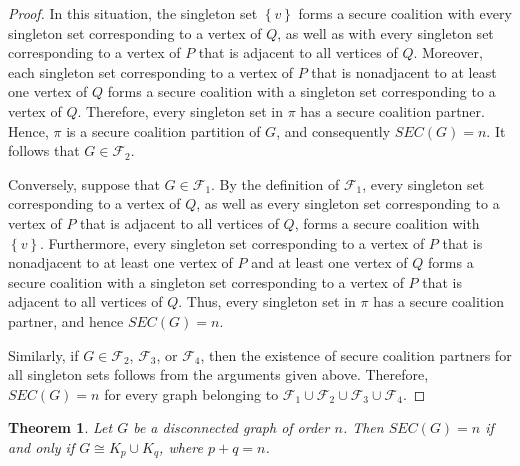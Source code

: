 \documentclass[12pt]{article}
\newtheorem{theorem}{Theorem}[section]
\begin{document}
\begin{proof}
In this situation, the singleton set $\left\{v\right\}$ forms a secure coalition with every singleton set corresponding to a vertex of $Q$, as well as with every singleton set corresponding to a vertex of $P$ that is adjacent to all vertices of $Q$. Moreover, each singleton set corresponding to a vertex of $P$ that is nonadjacent to at least one vertex of $Q$ forms a secure coalition with a singleton set corresponding to a vertex of $Q$. Therefore, every singleton set in $\pi$ has a secure coalition partner. Hence, $\pi$ is a secure coalition partition of $G$, and consequently $SEC(G)=n$. It follows that $G\in\mathcal{F}_2$.

\medskip

Conversely, suppose that $G\in\mathcal{F}_1$. By the definition of $\mathcal{F}_1$, every singleton set corresponding to a vertex of $Q$, as well as every singleton set corresponding to a vertex of $P$ that is adjacent to all vertices of $Q$, forms a secure coalition with $\left\{v\right\}$. Furthermore, every singleton set corresponding to a vertex of $P$ that is nonadjacent to at least one vertex of $P$ and at least one vertex of $Q$ forms a secure coalition with a singleton set corresponding to a vertex of $P$ that is adjacent to all vertices of $Q$. Thus, every singleton set in $\pi$ has a secure coalition partner, and hence
$SEC(G)=n$.

Similarly, if $G\in\mathcal{F}_2$, $\mathcal{F}_3$, or $\mathcal{F}_4$, then the existence of secure coalition partners for all singleton sets follows from the arguments given above. Therefore, $SEC(G)=n$ for every graph belonging to $\mathcal{F}_1\cup\mathcal{F}_2\cup\mathcal{F}_3\cup\mathcal{F}_4$.
\end{proof}
\begin{theorem}
Let $G$ be a disconnected graph of order $n$. Then $SEC(G)=n$
if and only if $G\cong K_p\cup K_q$, where $p+q=n$.
\end{theorem}
\end{document}
